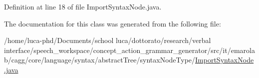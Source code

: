 Definition at line 18 of file Import\-Syntax\-Node.\-java.



The documentation for this class was generated from the following file\-:\begin{DoxyCompactItemize}
\item 
/home/luca-\/phd/\-Documents/school luca/dottorato/research/verbal interface/speech\-\_\-workspace/concept\-\_\-action\-\_\-grammar\-\_\-generator/src/it/emarolab/cagg/core/language/syntax/abstract\-Tree/syntax\-Node\-Type/\hyperlink{ImportSyntaxNode_8java}{Import\-Syntax\-Node.\-java}\end{DoxyCompactItemize}
